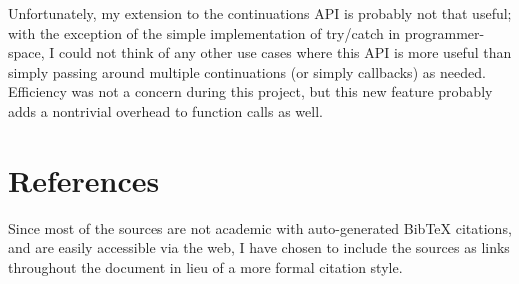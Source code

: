 \documentclass[]{article}
\begin{document}
Unfortunately, my extension to the continuations API is probably not that useful; with the exception of the simple implementation of try/catch in programmer-space, I could not think of any other use cases where this API is more useful than simply passing around multiple continuations (or simply callbacks) as needed. Efficiency was not a concern during this project, but this new feature probably adds a nontrivial overhead to function calls as well.

\section{References}
\label{sec:refe}

Since most of the sources are not academic with auto-generated BibTeX citations, and are easily accessible via the web, I have chosen to include the sources as links throughout the document in lieu of a more formal citation style.
\end{document}
